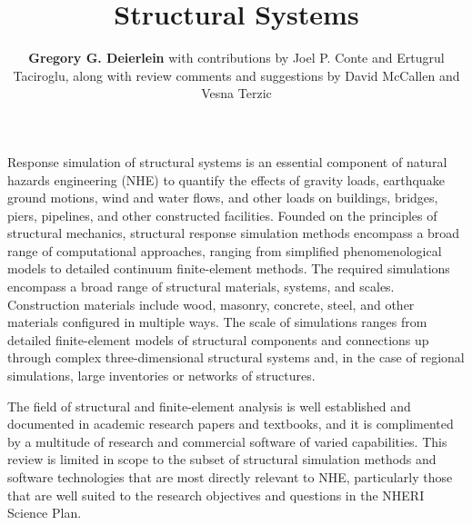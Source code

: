 %
%
%


\title{Structural Systems}
\author{
    \textbf{Gregory G. Deierlein}
    with contributions by Joel P. Conte and Ertugrul Taciroglu, 
    \newline
    along with review comments and suggestions by David McCallen and Vesna Terzic
}
\tocauthor{}
%
%
\maketitle
\label{chapter:res_struct}

Response simulation of structural systems is an essential component of natural hazards engineering (NHE) to quantify the effects of gravity loads, earthquake ground motions, wind and water flows, and other loads on buildings, bridges, piers, pipelines, and other constructed facilities. Founded on the principles of structural mechanics, structural response simulation methods encompass a broad range of computational approaches, ranging from simplified phenomenological models to detailed continuum finite-element methods. The required simulations encompass a broad range of structural materials, systems, and scales. Construction materials include wood, masonry, concrete, steel, and other materials configured in multiple ways. The scale of simulations ranges from detailed finite-element models of structural components and connections up through complex three-dimensional structural systems and, in the case of regional simulations, large inventories or networks of structures.

The field of structural and finite-element analysis is well established and documented in academic research papers and textbooks, and it is complimented by a multitude of research and commercial software of varied capabilities. This review is limited in scope to the subset of structural simulation methods and software technologies that are most directly relevant to NHE, particularly those that are well suited to the research objectives and questions in the NHERI Science Plan. 

